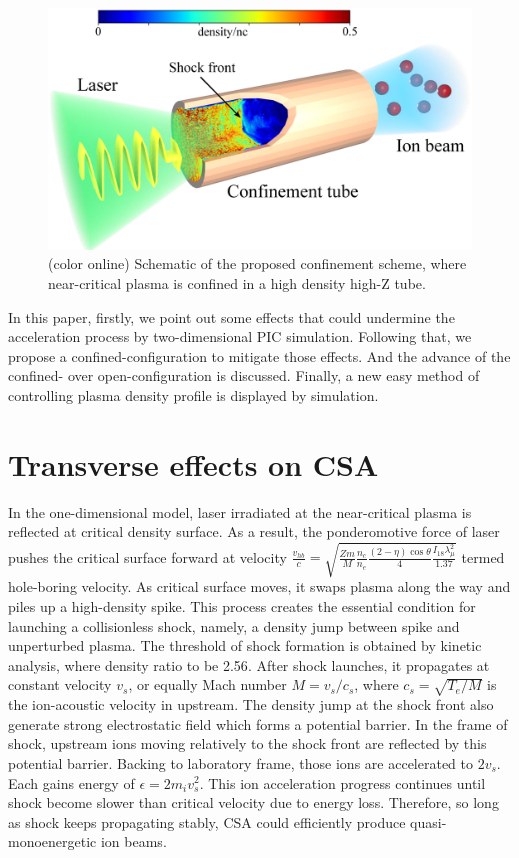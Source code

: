 \documentclass[12pt]{iopart}
\begin{document}
\begin{figure}
    \includegraphics[width=15cm]{sketch.eps}
    \caption{(color online) Schematic of the proposed confinement scheme, where near-critical plasma is confined in a high density high-Z tube.} \label{fig:sketch}
\end{figure}

In this paper, firstly, we point out some effects that could undermine the acceleration process by two-dimensional PIC simulation. Following that, we propose a confined-configuration to mitigate those effects. And the advance of the confined- over open-configuration is discussed. Finally, a new easy method of controlling plasma density profile is displayed by simulation. 
 
\section{Transverse effects on CSA}
\label{theory}
 
In the one-dimensional model, laser irradiated at the near-critical plasma is reflected at critical density surface. As a result, the ponderomotive force of laser pushes the critical surface forward at velocity $\frac{v_{hb}}{c}=\sqrt{\frac{Z m}{M}\frac{n_c}{n_e}\frac{(2-\eta)\cos\theta}{4}\frac{I_{18} \lambda_{\mu}^2}{1.37}}$ termed hole-boring velocity\cite{gibbon_short_2005}. As critical surface moves, it swaps plasma along the way and piles up a high-density spike. This process creates the essential condition for launching a collisionless shock, namely, a density jump between spike and unperturbed plasma. The threshold of shock formation is obtained by kinetic analysis\cite{fiuza_laser-driven_2012}, where density ratio to be 2.56\cite{zhang_quasi-monoenergetic_2016}. After shock launches, it propagates at constant velocity $v_{s}$, or equally Mach number $M=v_s/c_s$, where $c_s=\sqrt{T_e/M}$ is the ion-acoustic velocity in upstream\cite{tidman_shock_1971}. The density jump at the shock front also generate strong electrostatic field which forms a potential barrier. In the frame of shock, upstream ions moving relatively to the shock front are reflected by this potential barrier. Backing to laboratory frame, those ions are accelerated to $2v_s$. Each gains energy of $\epsilon=2m_i v_s^2$.  This ion acceleration progress continues until shock become slower than critical velocity due to energy loss. Therefore, so long as shock keeps propagating stably, CSA could efficiently produce quasi-monoenergetic ion beams.
\end{document}
